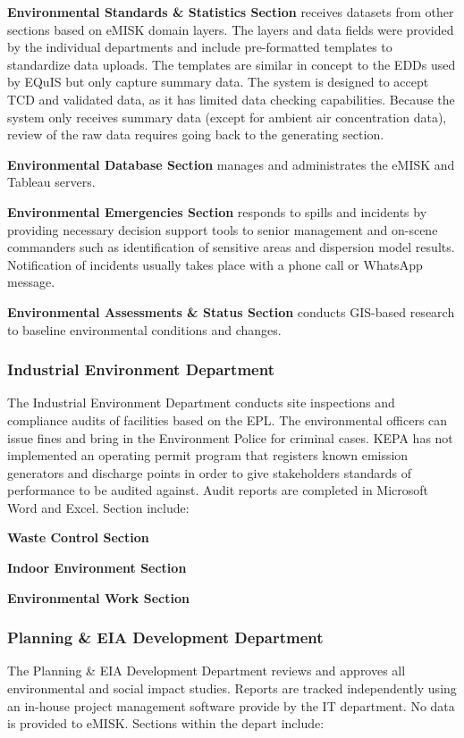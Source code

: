 \textbf{Environmental Standards \& Statistics Section} receives datasets from other sections based on eMISK domain layers. The layers and data fields were provided by the individual departments and include pre-formatted templates to standardize data uploads. The templates are similar in concept to the EDDs used by EQuIS but only capture summary data. The system is designed to accept TCD and validated data, as it has limited data checking capabilities. Because the system only receives summary data (except for ambient air concentration data), review of the raw data requires going back to the generating section.

\textbf{Environmental Database Section} manages and administrates the eMISK and Tableau servers.

\textbf{Environmental Emergencies Section} responds to spills and incidents by providing necessary decision support tools to senior management and on-scene commanders such as identification of sensitive areas and dispersion model results. Notification of incidents usually takes place with a phone call or WhatsApp message.

\textbf{Environmental Assessments \& Status Section} conducts GIS-based research to baseline environmental conditions and changes.

\subsubsection{Industrial Environment Department}

The Industrial Environment Department conducts site inspections and compliance audits of facilities based on the EPL. The environmental officers can issue fines and bring in the Environment Police for criminal cases. KEPA has not implemented an operating permit program that registers known emission generators and discharge points in order to give stakeholders standards of performance to be audited against. Audit reports are completed in Microsoft Word and Excel. Section include:

\textbf{Waste Control Section}

\textbf{Indoor Environment Section}

\textbf{Environmental Work Section}

\subsubsection{Planning \&  EIA Development Department}

The Planning \& EIA Development Department reviews and approves all environmental and social impact studies. Reports are tracked independently using an in-house project management software provide by the IT department. No data is provided to eMISK. Sections within the depart include:

